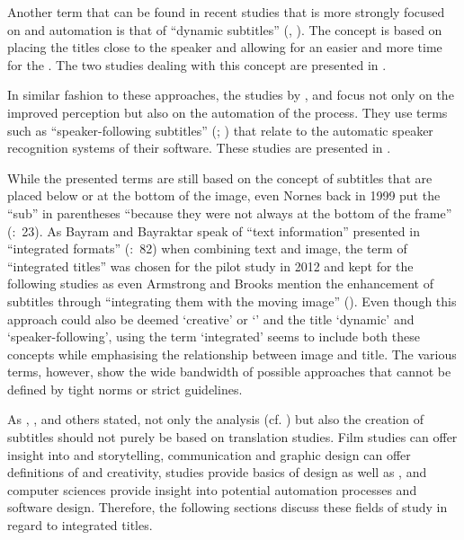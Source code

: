 Another term that can be found in recent studies that is more strongly focused on  and automation is that of “dynamic subtitles” (\citealt{Armstrong2014},  \citealt{Brown2015}). The concept is based on placing the titles close to the speaker and allowing for an easier  and more time for the . The two  studies dealing with this concept are presented in .

In similar fashion to these approaches, the studies by \citet{park2008}, \citet{Hong2010} and \citet{Hu2013} focus not only on the improved perception but also on the automation of the process. They use terms such as “speaker-following subtitles” (\citealt{Hong2010}; \citealt{Hu2013}) that relate to the automatic speaker recognition systems of their software. These studies are presented in .

While the presented terms are still based on the concept of subtitles that are placed below or at the bottom of the image, even Nornes back in 1999 put the “sub” in parentheses “because they were not always at the bottom of the frame” (\citealt{nornes1999}:~23). As Bayram and Bayraktar speak of “text information” presented in “integrated formats” (\citeyear{Bayram2012}:~82) when combining text and image, the term of “integrated titles” was chosen for the pilot study in 2012 and kept for the following studies as even Armstrong and Brooks mention the enhancement of subtitles through “integrating them with the moving image” (\citeyear{Armstrong2014}). Even though this approach could also be deemed ‘creative’ or ‘’ and the title  ‘dynamic’ and ‘speaker-following’, using the term ‘integrated’ seems to include both these concepts while emphasising the relationship between image and title. The various terms, however, show the wide bandwidth of possible approaches that cannot be defined by tight norms or strict guidelines.

As \citet{Foerster2010}, \citet{mcclarty2012}, and others stated, not only the analysis (cf. \citealt{Chaume2004}) but also the creation of subtitles should not purely be based on translation studies. Film studies can offer insight into  and storytelling, communication and graphic design can offer definitions of  and creativity,  studies provide basics of  design as well as , and computer sciences provide insight into potential automation processes and software design. Therefore, the following sections discuss these fields of study in regard to integrated titles.

